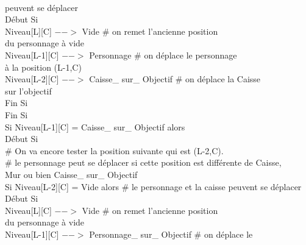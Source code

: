 \documentclass{article}
\begin{document}
\begin{tabbing}
\\ \hspace{4cm} peuvent se déplacer
\\	\hspace{4cm}		Début Si
\\	\hspace{5cm}			Niveau[L][C] $-->$ Vide 			\# on remet l'ancienne position
\\ \hspace{5cm} du personnage à vide
\\	\hspace{5cm}			Niveau[L-1][C] $-->$ Personnage		\# on déplace le personnage
\\ \hspace{5cm} à la position (L-1,C)
\\	\hspace{5cm}			Niveau[L-2][C] $-->$ Caisse\_ sur\_ Objectif	\# on déplace la Caisse
\\ \hspace{5cm} sur l'objectif
\\	\hspace{4cm}		Fin Si
\\	\hspace{3cm}	Fin Si 
\\	\hspace{3cm}	Si Niveau[L-1][C] = Caisse\_ sur\_ Objectif alors			
\\	\hspace{3cm}	Début Si
\\	\hspace{4cm}		\# On va encore tester la position suivante qui est (L-2,C). 
\\	\hspace{4cm}		\# le personnage peut se déplacer si cette position est différente de Caisse,
\\ \hspace{4cm} Mur ou bien Caisse\_ sur\_ Objectif
\\	\hspace{4cm}		Si Niveau[L-2][C] = Vide alors          		\# le personnage et la caisse peuvent se déplacer
\\	\hspace{4cm}		Début Si
\\	\hspace{5cm}			Niveau[L][C] $-->$ Vide				\# on remet l'ancienne position
\\ \hspace{5cm} du personnage à vide
\\	\hspace{5cm}			Niveau[L-1][C] $-->$ Personnage\_ sur\_ Objectif	\# on déplace le  

\end{tabbing}
\end{document}

